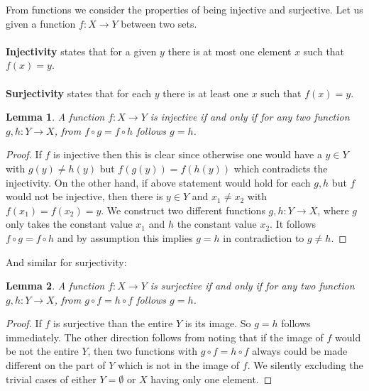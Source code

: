 \documentclass[17pt]{extarticle}
\newtheorem*{lemma*}{Lemma}
\begin{document}
From functions we consider the properties of being injective and surjective.
Let us given a function $f:X\rightarrow Y$ between two sets.\\ \\
\textbf{Injectivity} states that for a given $y$ there is at most one element $x$ such that $f(x)=y$.\\ \\
\textbf{Surjectivity} states that for each $y$ there is at least one $x$ such that $f(x)=y$.\\

\begin{lemma*}
A function $f:X\rightarrow Y$ is injective if and only if for any two function $g,h:Y\rightarrow X$, from $f\circ g=f\circ h$ follows $g=h$.
\end{lemma*}
\begin{proof}
If $f$ is injective then this is clear since otherwise one would have a $y \in Y$ with $g(y)\neq h(y)$ but $f(g(y))=f(h(y))$
which contradicts the injectivity. On the other hand, if above statement would hold for each $g,h$ but $f$ would not be injective, then there is $y\in Y$ and $x_1\neq x_2$ with $f(x_1)=f(x_2)=y$. We construct two different functions $g, h:Y\rightarrow X$, where $g$ only takes the constant value $x_1$ and $h$ the constant value $x_2$. It follows $f\circ g=f\circ h$ and by assumption this implies $g=h$ in contradiction to $g\neq h$.
\end{proof}
And similar for surjectivity:
\begin{lemma*}
	A function $f:X\rightarrow Y$ is surjective if and only if
	for any two function $g,h:Y\rightarrow X$, from $g\circ f=h\circ f$ follows $g=h$.
\end{lemma*}
\begin{proof}
If $f$ is surjective than the entire $Y$ is its image. So $g=h$ follows immediately. The other direction follows from noting that if the image of $f$ would be not the entire $Y$, then two functions with $g\circ f=h\circ f$ always could 
be made different on the part of $Y$ which is not in the image of $f$. We silently excluding the trivial cases of either $Y=\emptyset$ or $X$ having only one element.
\end{proof}
\end{document}
